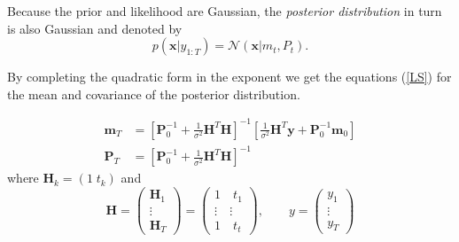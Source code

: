 Because the prior and likelihood are Gaussian, the \textit{posterior distribution}
in turn is also Gaussian and denoted by
$$ p(\mathbf{x} | y_{1:T}) = \mathcal{N}(\mathbf{x} | m_t, P_t). $$

By completing the quadratic form in the exponent
we get the equations (\ref{LS}) for the mean and covariance
of the posterior distribution.

\begin{equation}
  \label{LS}
  \begin{aligned}
    \mathbf{m}_T &= \left[ \mathbf{P}^{-1}_0 + \frac{1}{\sigma^2} \mathbf{H}^T \mathbf{H}
                   \right]^{-1} \left[\frac{1}{\sigma^2} \mathbf{H}^T \mathbf{y} +
                   \mathbf{P}^{-1}_0 \mathbf{m}_0 \right] \\
    \mathbf{P}_T &= \left[\mathbf{P}_0^{-1} + \frac{1}{\sigma^2} \mathbf{H}^T \mathbf{H}
                 \right]^{-1}
  \end{aligned}
\end{equation}
where $\mathbf{H}_k = (1 \;t_k)$ and
$$ \mathbf{H} =
\begin{pmatrix} \mathbf{H}_1 \\ \vdots \\ \mathbf{H}_T \end{pmatrix}
= \begin{pmatrix}
  1 \quad t_1 \\
  \vdots \quad \vdots \\
  1 \quad t_t
\end{pmatrix},
\quad \quad y = \begin{pmatrix} y_1 \\ \vdots \\ y_T \end{pmatrix}
$$


